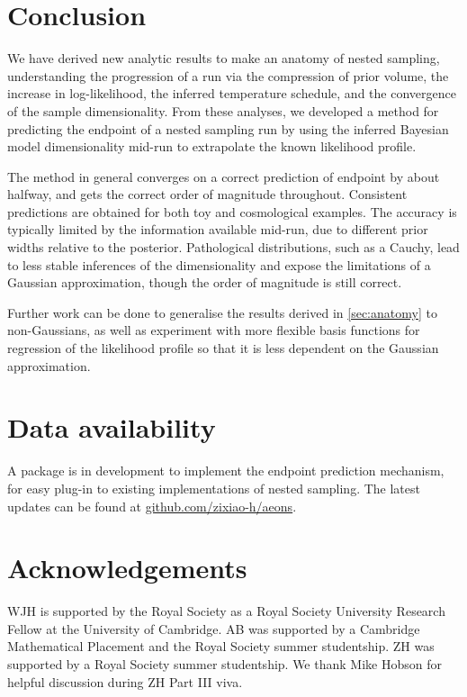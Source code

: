 \documentclass[usenatbib]{mnras}
\begin{document}
\section{Conclusion}
We have derived new analytic results to make an anatomy of nested sampling, understanding the progression of a run via the compression of prior volume, the increase in log-likelihood, the inferred temperature schedule, and the convergence of the sample dimensionality. From these analyses, we developed a method for predicting the endpoint of a nested sampling run by using the inferred Bayesian model dimensionality mid-run to extrapolate the known likelihood profile. 
\par
The method in general converges on a correct prediction of endpoint by about halfway, and gets the correct order of magnitude throughout. Consistent predictions are obtained for both toy and cosmological examples. The accuracy is typically limited by the information available mid-run, due to different prior widths relative to the posterior. Pathological distributions, such as a Cauchy, lead to less stable inferences of the dimensionality and expose the limitations of a Gaussian approximation, though the order of magnitude is still correct.
\par
Further work can be done to generalise the results derived in \cref{sec:anatomy} to non-Gaussians, as well as experiment with more flexible basis functions for regression of the likelihood profile so that it is less dependent on the Gaussian approximation.

\section*{Data availability}
A package is in development to implement the endpoint prediction mechanism, for easy plug-in to existing implementations of nested sampling. The latest updates can be found at \href{https://github.com/zixiao-h/aeons}{github.com/zixiao-h/aeons}.

\section*{Acknowledgements}
WJH is supported by the Royal Society as a Royal Society University Research Fellow at the University of Cambridge. AB was supported by a Cambridge Mathematical Placement and the Royal Society summer studentship. ZH was supported by a Royal Society summer studentship. We thank Mike Hobson for helpful discussion during ZH Part III viva.




\label{lastpage}
\end{document}
